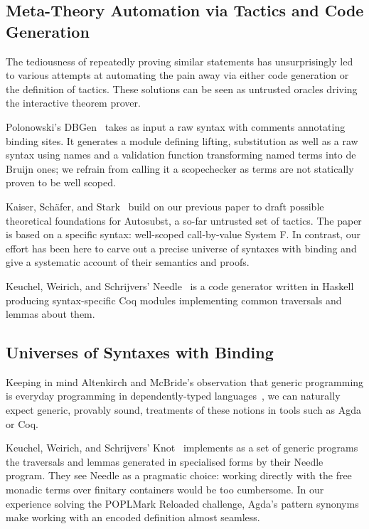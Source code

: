 {\subsection{Meta-Theory Automation via Tactics and Code Generation} The
tediousness of repeatedly
proving similar statements has unsurprisingly led to various attempts at
automating the pain away via either code generation or the definition of
tactics. These solutions can be seen as untrusted oracles driving the
interactive theorem prover.

Polonowski's DBGen~\citeyear{polonowski:db} takes as input a raw syntax with
comments annotating binding sites. It generates a module defining lifting,
substitution as well as a raw syntax using names and a validation function
transforming named terms into de Bruijn ones; we refrain from calling it a
scopechecker as terms are not statically proven to be well scoped.

Kaiser, Schäfer, and Stark~\citeyear{Kaiser-wsdebr} build on our previous paper
to draft possible theoretical foundations for Autosubst, a so-far untrusted
set of tactics. The paper is based on a specific syntax: well-scoped call-by-value
System F. In contrast, our effort has been here to carve out
a precise universe of syntaxes with binding and give a systematic account
of their semantics and proofs.

Keuchel, Weirich, and Schrijvers' Needle~\citeyear{needleandknot} is a code
generator written in Haskell producing syntax-specific Coq modules
implementing common traversals and lemmas about them.

\subsection{Universes of Syntaxes with Binding} Keeping in mind Altenkirch
and McBride's observation that generic programming is everyday programming
in dependently-typed languages~\citeyear{genericprogramming-dtp}, we can naturally
expect generic, provably sound, treatments of these notions in tools such as
Agda or Coq.

Keuchel, Weirich, and Schrijvers' Knot~\citeyear{needleandknot} implements
as a set of generic programs the traversals and lemmas generated in specialised
forms by their Needle program. They see Needle as a pragmatic choice: working
directly with the free monadic terms over finitary containers would be too cumbersome. In
our experience solving the POPLMark Reloaded challenge, Agda's pattern
synonyms~\cite{Pickering:patsyn} make working with an encoded definition almost
seamless.

}
